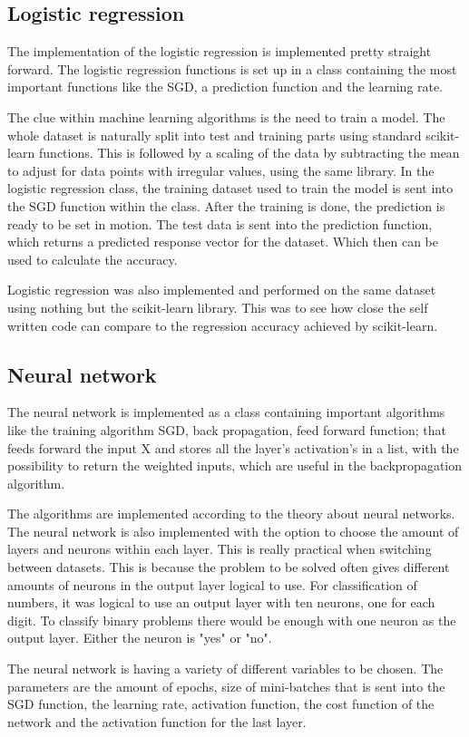 \documentclass[../main.tex]{subfiles}
\begin{document}
\subsection{Logistic regression}\label{sec:3logreg}
The implementation of the logistic regression is implemented pretty straight forward. The logistic regression functions is set up in a class containing the most important functions like the SGD, a prediction function and the learning rate.

The clue within machine learning algorithms is the need to train a model. The whole dataset is naturally split into test and training parts using standard scikit-learn functions. This is followed by a scaling of the data by subtracting the mean to adjust for data points with irregular values, using the same library. In the logistic regression class, the training dataset used to train the model is sent into the SGD function within the class. After the training is done, the prediction is ready to be set in motion. The test data is sent into the prediction function, which returns a predicted response vector for the dataset. Which then can be used to calculate the accuracy.

Logistic regression was also implemented and performed on the same dataset using nothing but the scikit-learn library. This was to see how close the self written code can compare to the regression accuracy achieved by scikit-learn.

\subsection{Neural network}
The neural network is implemented as a class containing important algorithms like the training algorithm SGD, back propagation, feed forward function; that feeds forward the input X and stores all the layer's activation's in a list, with the possibility to return the weighted inputs, which are useful in the backpropagation algorithm.

The algorithms are implemented according to the theory about neural networks. The neural network is also implemented with the option to choose the amount of layers and neurons within each layer. This is really practical when switching between datasets. This is because the problem to be solved often gives different amounts of neurons in the output layer logical to use. For classification of numbers, it was logical to use an output layer with ten neurons, one for each digit. To classify binary problems there would be enough with one neuron as the output layer. Either the neuron is "yes" or "no".

The neural network is having a variety of different variables to be chosen. The parameters are the amount of epochs, size of mini-batches that is sent into the SGD function, the learning rate, activation function, the cost function of the network and the activation function for the last layer.
\end{document}
